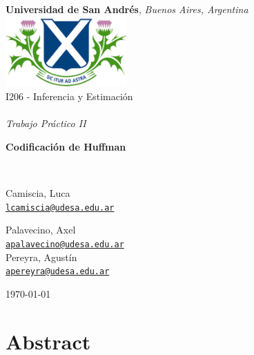 \documentclass[a4paper, 10pt]{article}
\begin{document}
\begin{titlepage}
    \centering
    {\large \textbf{Universidad de San Andrés}, \textit{Buenos Aires, Argentina}} \\
    \vspace{0.2cm}
    \bigskip
    \includegraphics[width=0.35\textwidth]{figures/udesa_logo.png} \\
    \vspace{1cm}
    {\large  I206 - Inferencia y Estimación} \\
    \vspace{0.2cm}
    \noindent\hrulefill\\
    \vspace{0.5cm}
    {\Large \textit{Trabajo Práctico II}} \\
    { \Huge \textbf{Codificación de Huffman} \par}
    \vspace{0.5cm}
    \noindent\hrulefill\\
    \vspace{1.5cm}
    {\Large 
    Camiscia, Luca \\
    {\large \texttt{\href{mailto:lcamiscia@udesa.edu.ar}{lcamiscia@udesa.edu.ar}}} \\[0.5em]
    \par
    Palavecino, Axel \\ 
    {\large \texttt{\href{mailto:apalavecino@udesa.edu.ar}{apalavecino@udesa.edu.ar}}} \\[0.5em]
    Pereyra, Agustín \\ 
    {\large \texttt{\href{mailto:apereyra@udesa.edu.ar}{apereyra@udesa.edu.ar}}}\\[0.5em]
    }
    \vfill
    {\today \par}
\end{titlepage}


\section*{Abstract}
\end{document}
